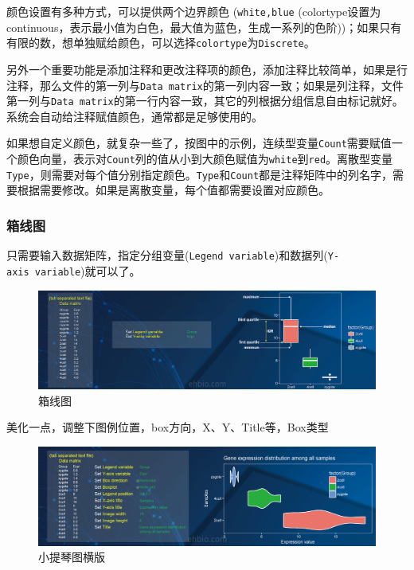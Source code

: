 \documentclass[]{article}
\numberwithin{figure}{section}
\numberwithin{table}{section}
\theoremstyle{definition}
\theoremstyle{definition}
\theoremstyle{definition}
\theoremstyle{remark}
\begin{document}
颜色设置有多种方式，可以提供两个边界颜色 (\texttt{white,blue}
(colortype设置为continuous，表示最小值为白色，最大值为蓝色，生成一系列的色阶))；如果只有有限的数，想单独赋给颜色，可以选择\texttt{colortype}为\texttt{Discrete}。

另外一个重要功能是添加注释和更改注释项的颜色，添加注释比较简单，如果是行注释，那么文件的第一列与\texttt{Data\ matrix}的第一列内容一致；如果是列注释，文件第一列与\texttt{Data\ matrix}的第一行内容一致，其它的列根据分组信息自由标记就好。系统会自动给注释赋值颜色，通常都是足够使用的。

如果想自定义颜色，就复杂一些了，按图中的示例，连续型变量\texttt{Count}需要赋值一个颜色向量，表示对\texttt{Count}列的值从小到大颜色赋值为\texttt{white}到\texttt{red}。离散型变量\texttt{Type}，则需要对每个值分别指定颜色。\texttt{Type}和\texttt{Count}都是注释矩阵中的列名字，需要根据需要修改。如果是离散变量，每个值都需要设置对应颜色。

\subsubsection{箱线图}\label{-1}

只需要输入数据矩阵，指定分组变量(\texttt{Legend\ variable})和数据列(\texttt{Y-axis\ variable})就可以了。

\begin{figure}[H]

{\centering \includegraphics[width=0.95\linewidth,height=0.7\textheight,keepaspectratio]{images/Boxplot_1} 

}

\caption{箱线图}\label{fig:unnamed-chunk-252}
\end{figure}

美化一点，调整下图例位置，box方向，X、Y、Title等，Box类型

\begin{figure}[H]

{\centering \includegraphics[width=0.95\linewidth,height=0.7\textheight,keepaspectratio]{images/Boxplot_2} 

}

\caption{小提琴图横版}\label{fig:unnamed-chunk-253}
\end{figure}
\end{document}

